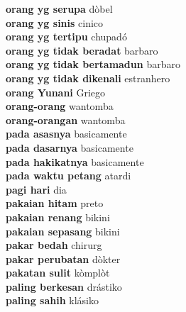 \textbf{ orang yg serupa  } dòbel \\
\textbf{ orang yg sinis  } cinico \\
\textbf{ orang yg tertipu  } chupadó \\
\textbf{ orang yg tidak beradat  } barbaro \\
\textbf{ orang yg tidak bertamadun  } barbaro \\
\textbf{ orang yg tidak dikenali  } estranhero \\
\textbf{ orang Yunani  } Griego \\
\textbf{ orang-orang  } wantomba \\
\textbf{ orang-orangan  } wantomba \\
\textbf{ pada asasnya  } basicamente \\
\textbf{ pada dasarnya  } basicamente \\
\textbf{ pada hakikatnya  } basicamente \\
\textbf{ pada waktu petang  } atardi \\
\textbf{ pagi hari  } dia \\
\textbf{ pakaian hitam  } preto \\
\textbf{ pakaian renang  } bikini \\
\textbf{ pakaian sepasang  } bikini \\
\textbf{ pakar bedah  } chirurg \\
\textbf{ pakar perubatan  } dòkter \\
\textbf{ pakatan sulit  } kòmplòt \\
\textbf{ paling berkesan  } drástiko \\
\textbf{ paling sahih  } klásiko \\
